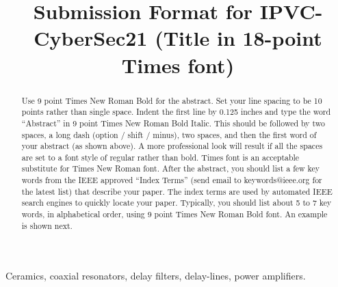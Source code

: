 \documentclass[conference]{IEEEtran}
\begin{document}
\title{\LARGE Submission Format for IPVC-CyberSec21 (Title in 18-point Times font)}


\maketitle

\begin{abstract}
Use 9 point Times New Roman Bold for the abstract. Set your line spacing to be 10 points rather than single space. Indent the first line by 0.125 inches and type the word ``Abstract'' in 9 point Times New Roman Bold Italic. This should be followed by two spaces, a long dash (option / shift / minus), two spaces, and then the first word of your abstract (as shown above). A more professional look will result if all the spaces are set to a font style of regular rather than bold. Times font is an acceptable substitute for Times New Roman font. After the abstract, you should list a few key words from the IEEE approved “Index Terms” (send email to keywords@ieee.org for the latest list) that describe your paper. The index terms are used by automated IEEE search engines to quickly locate your paper. Typically, you should list about 5 to 7 key words, in alphabetical order, using 9 point Times New Roman Bold font. An example is shown next.
\end{abstract}
\IEEEoverridecommandlockouts
\begin{keywords}
Ceramics, coaxial resonators, delay filters, delay-lines, power
amplifiers.
\end{keywords}

%
\IEEEpeerreviewmaketitle
\end{document}
